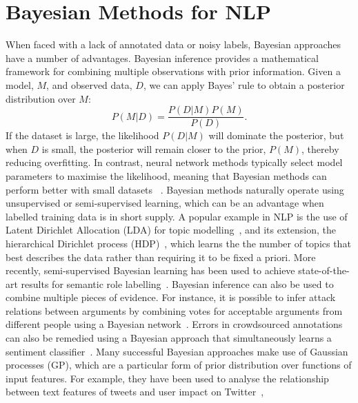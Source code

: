 \section{Bayesian Methods for NLP}\label{sec:bayesian}

When faced with a lack of annotated data or noisy labels, 
Bayesian approaches have a number of advantages.
Bayesian inference provides a mathematical framework for combining multiple observations
with prior information. Given a model, $M$, and observed data, $D$, we can apply Bayes' rule
to obtain a posterior distribution over $M$:
\begin{equation}
  P(M | D ) = \frac{P(D|M)P(M)}{P(D)}.
\end{equation}
If the dataset is large, the likelihood $P(D|M)$ will dominate the posterior,
but when $D$ is small, the posterior will remain closer to the prior, $P(M)$,
thereby reducing overfitting.
In contrast, neural network methods typically select model parameters to maximise the likelihood,
meaning that Bayesian methods can perform better with small datasets ~\cite{xiong2011bayesian}.
Bayesian methods naturally operate using unsupervised or semi-supervised learning,
which can be an advantage when labelled training data is in short supply.
A popular example in NLP is the use of  Latent Dirichlet Allocation (LDA) for topic modelling~\cite{blei2003latent}, 
and its extension, the hierarchical Dirichlet process (HDP)~\cite{teh2005sharing}, which learns the 
the number of topics that best describes the data rather than requiring it to be fixed a priori.
More recently, semi-supervised Bayesian learning
has been used to achieve state-of-the-art results for semantic role labelling~\cite{titov2012bayesian}.
Bayesian inference can also be used to combine multiple pieces of evidence.
For instance, it is possible to infer attack relations between arguments by combining votes for acceptable arguments from different people using a Bayesian network~\cite{kido2017}.
Errors in crowdsourced annotations can also be remedied using a Bayesian approach
that simultaneously learns a sentiment classifier~\cite{simpson2015language,felt2016semantic}.
Many successful Bayesian approaches make use of Gaussian processes (GP), which are a particular form of prior
distribution over functions of input features. For example, 
they have been used to analyse the relationship between text features of tweets and user impact on Twitter~\cite{lampos2014predicting}, 
